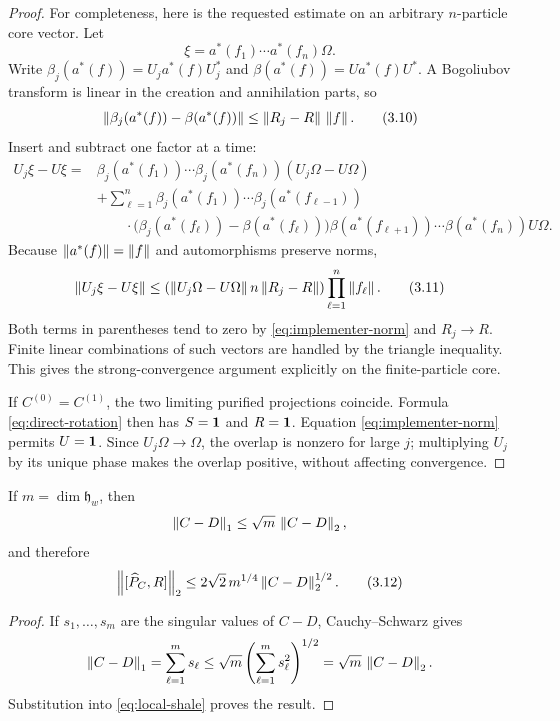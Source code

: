 \begin{proof}
For completeness, here is the requested estimate on an arbitrary
$n$-particle core vector.  Let
\[
 \xi=a^*(f_1)\cdots a^*(f_n)\Omega .
\]
Write $\beta_j(a^*(f))=U_ja^*(f)U_j^*$ and
$\beta(a^*(f))=Ua^*(f)U^*$.  A Bogoliubov transform is linear in the
creation and annihilation parts, so
\[
 \left\lVert \beta_j(a^*(f))-\beta(a^*(f))\right\rVert
 \le\left\lVert R_j-R\right\rVert\,\left\lVert f\right\rVert.
\tag{3.10}\label{eq:field-bound}
\]
Insert and subtract one factor at a time:
\[
\begin{aligned}
U_j\xi-U\xi
={}&
\beta_j(a^*(f_1))\cdots\beta_j(a^*(f_n))
  (U_j\Omega-U\Omega)\\
&+\sum_{\ell=1}^n
\beta_j(a^*(f_1))\cdots\beta_j(a^*(f_{\ell-1}))\\
&\qquad\cdot
\bigl(\beta_j(a^*(f_\ell))-\beta(a^*(f_\ell))\bigr)
\beta(a^*(f_{\ell+1}))\cdots\beta(a^*(f_n))U\Omega .
\end{aligned}
\]
Because $\left\lVert a^*(f)\right\rVert=\left\lVert f\right\rVert$ and automorphisms preserve norms,
\[
\left\lVert U_j\xi-U\xi\right\rVert
\le
\left(
\left\lVert U_j\Omega-U\Omega\right\rVert
n\left\lVert R_j-R\right\rVert
\right)\prod_{\ell=1}^n\left\lVert f_\ell\right\rVert.
\tag{3.11}\label{eq:nparticle}
\]
Both terms in parentheses tend to zero by
\eqref{eq:implementer-norm} and $R_j\to R$.  Finite linear combinations
of such vectors are handled by the triangle inequality.  This gives the
strong-convergence argument explicitly on the finite-particle core.

If $C^{(0)}=C^{(1)}$, the two limiting purified projections coincide.
Formula \eqref{eq:direct-rotation} then has $S=\mathbf 1$ and $R=\mathbf 1$.
Equation \eqref{eq:implementer-norm} permits $U=\mathbf 1$.  Since
$U_j\Omega\to\Omega$, the overlap is nonzero for large $j$; multiplying
$U_j$ by its unique phase makes the overlap positive, without affecting
convergence.
\end{proof}

\begin{corollary}
\label{cor:measured}
If $m=\dim\mathfrak h_w$, then
\[
 \left\lVert C-D\right\rVert_1\le\sqrt m\,\left\lVert C-D\right\rVert_2,
\]
and therefore
\[
 \left\lVert [\widehat P_C,R]\right\rVert_2
 \le2\sqrt2\,m^{1/4}\left\lVert C-D\right\rVert_2^{1/2}.
\tag{3.12}
\]
\end{corollary}

\begin{proof}
If $s_1,\ldots,s_m$ are the singular values of $C-D$, Cauchy--Schwarz
gives
\[
 \left\lVert C-D\right\rVert_1=\sum_{\ell=1}^m s_\ell
\le\sqrt m\left(\sum_{\ell=1}^m s_\ell^2\right)^{1/2}
=\sqrt m\,\left\lVert C-D\right\rVert_2.
\]
Substitution into \eqref{eq:local-shale} proves the result.
\end{proof}

